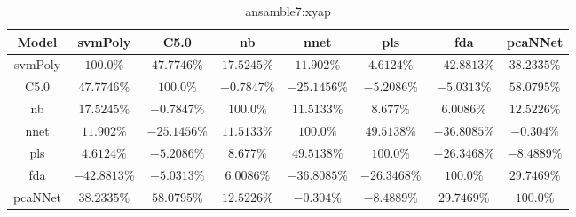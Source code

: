 \begin{table}[!ht]
	\centering
	\begin{tabular}{|c|c|c|c|c|c|c|c|}
		\hline
		Model & svmPoly & C5.0 & nb & nnet & pls & fda & pcaNNet \\ \hline
		svmPoly & $100.0\%$ & $47.7746\%$ & $17.5245\%$ & $11.902\%$ & $4.6124\%$ & $-42.8813\%$ & $38.2335\%$ \\ \hline
		C5.0 & $47.7746\%$ & $100.0\%$ & $-0.7847\%$ & $-25.1456\%$ & $-5.2086\%$ & $-5.0313\%$ & $58.0795\%$ \\ \hline
		nb & $17.5245\%$ & $-0.7847\%$ & $100.0\%$ & $11.5133\%$ & $8.677\%$ & $6.0086\%$ & $12.5226\%$ \\ \hline
		nnet & $11.902\%$ & $-25.1456\%$ & $11.5133\%$ & $100.0\%$ & $49.5138\%$ & $-36.8085\%$ & $-0.304\%$ \\ \hline
		pls & $4.6124\%$ & $-5.2086\%$ & $8.677\%$ & $49.5138\%$ & $100.0\%$ & $-26.3468\%$ & $-8.4889\%$ \\ \hline
		fda & $-42.8813\%$ & $-5.0313\%$ & $6.0086\%$ & $-36.8085\%$ & $-26.3468\%$ & $100.0\%$ & $29.7469\%$ \\ \hline
		pcaNNet & $38.2335\%$ & $58.0795\%$ & $12.5226\%$ & $-0.304\%$ & $-8.4889\%$ & $29.7469\%$ & $100.0\%$ \\ \hline
	\end{tabular}
	\caption{ansamble7:xyap}
	\label{tab:ansamble7:xyap}
\end{table}
